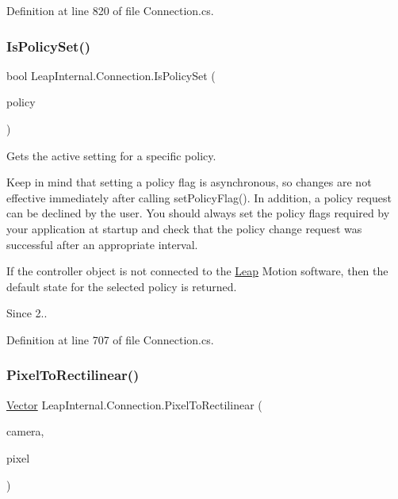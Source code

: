 Definition at line 820 of file Connection.\+cs.

\mbox{\label{class_leap_internal_1_1_connection_a6e2e5ee305e33e8d8c3782708e53b95c}} 
\subsubsection{\texorpdfstring{IsPolicySet()}{IsPolicySet()}}
{\footnotesize\ttfamily bool Leap\+Internal.\+Connection.\+Is\+Policy\+Set (\begin{DoxyParamCaption}\item[{\mbox{\hyperlink{class_leap_1_1_controller_a0bdb49fa94aa2da8b098c1ac296528d6}{Controller.\+Policy\+Flag}}}]{policy }\end{DoxyParamCaption})}



Gets the active setting for a specific policy. 

Keep in mind that setting a policy flag is asynchronous, so changes are not effective immediately after calling set\+Policy\+Flag(). In addition, a policy request can be declined by the user. You should always set the policy flags required by your application at startup and check that the policy change request was successful after an appropriate interval.

If the controller object is not connected to the \mbox{\hyperlink{namespace_leap}{Leap}} Motion software, then the default state for the selected policy is returned.

\begin{DoxySince}{Since}
2.. 
\end{DoxySince}


Definition at line 707 of file Connection.\+cs.

\mbox{\label{class_leap_internal_1_1_connection_ac5ddffb50ba506fb3465c8a966beca95}} 
\subsubsection{\texorpdfstring{PixelToRectilinear()}{PixelToRectilinear()}}
{\footnotesize\ttfamily \mbox{\hyperlink{struct_leap_1_1_vector}{Vector}} Leap\+Internal.\+Connection.\+Pixel\+To\+Rectilinear (\begin{DoxyParamCaption}\item[{\mbox{\hyperlink{class_leap_1_1_image_a28310e43e0f2d7f7117e1b45330bdc38}{Image.\+Camera\+Type}}}]{camera,  }\item[{\mbox{\hyperlink{struct_leap_1_1_vector}{Vector}}}]{pixel }\end{DoxyParamCaption})}



